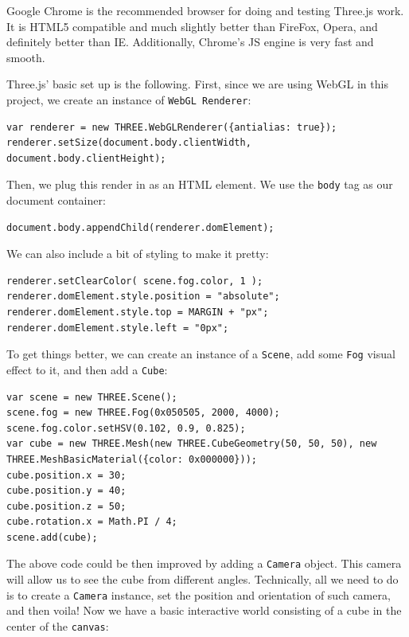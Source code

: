 Google Chrome is the recommended browser for doing and testing Three.js work. It is HTML5 compatible and much slightly better than FireFox, Opera, and definitely better than IE. Additionally, Chrome’s JS engine is very fast and smooth.


Three.js' basic set up is the following. First, since we are using WebGL in this project, we create an instance of \texttt{WebGL Renderer}:

\begin{lstlisting}
var renderer = new THREE.WebGLRenderer({antialias: true});
renderer.setSize(document.body.clientWidth, document.body.clientHeight);
\end{lstlisting}

Then, we plug this render in as an HTML element. We use the \texttt{body} tag as our document container:

\begin{lstlisting}
document.body.appendChild(renderer.domElement);
\end{lstlisting}

We can also include a bit of styling to make it pretty:

\begin{lstlisting}
renderer.setClearColor( scene.fog.color, 1 );
renderer.domElement.style.position = "absolute";
renderer.domElement.style.top = MARGIN + "px";
renderer.domElement.style.left = "0px";
\end{lstlisting}

To get things better, we can create an instance of a \texttt{Scene}, add some \texttt{Fog} visual effect to it, and then add a \texttt{Cube}: 

\begin{lstlisting}
var scene = new THREE.Scene();
scene.fog = new THREE.Fog(0x050505, 2000, 4000);
scene.fog.color.setHSV(0.102, 0.9, 0.825);
var cube = new THREE.Mesh(new THREE.CubeGeometry(50, 50, 50), new THREE.MeshBasicMaterial({color: 0x000000}));
cube.position.x = 30;
cube.position.y = 40;
cube.position.z = 50;
cube.rotation.x = Math.PI / 4;
scene.add(cube);
\end{lstlisting}

The above code could be then improved by adding a \texttt{Camera} object. This camera will allow us to see the cube from different angles. Technically, all we need to do is to create a \texttt{Camera} instance, set the position and orientation of such camera, and then voila! Now we have a basic interactive world consisting of a cube in the center of the \texttt{canvas}:

